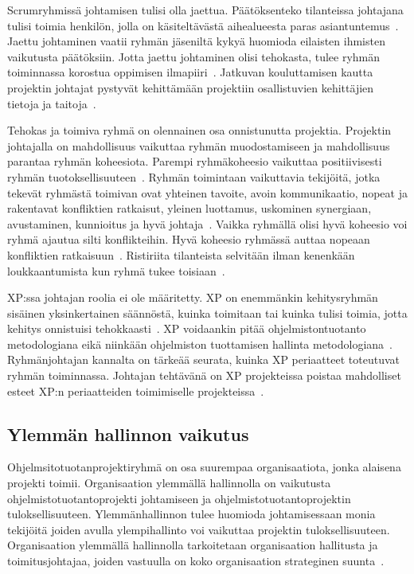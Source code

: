\documentclass[finnish]{tktltiki2}
\theoremstyle{definition}
\theoremstyle{remark}
\begin{document}
Scrumryhmissä johtamisen tulisi olla jaettua. Päätöksenteko tilanteissa johtajana tulisi toimia henkilön, jolla on käsiteltävästä aihealueesta paras asiantuntemus~\cite{4755768}. Jaettu johtaminen vaatii ryhmän jäseniltä kykyä huomioda eilaisten ihmisten vaikutusta päätöksiin. Jotta jaettu johtaminen olisi tehokasta, tulee ryhmän toiminnassa korostua oppimisen ilmapiiri~\cite{4755768}. Jatkuvan kouluttamisen kautta projektin johtajat pystyvät kehittämään projektiin osallistuvien kehittäjien tietoja ja taitoja~\cite{dall2004project}.

Tehokas ja toimiva ryhmä on olennainen osa onnistunutta projektia. Projektin johtajalla on mahdollisuus vaikuttaa ryhmän muodostamiseen ja mahdollisuus parantaa ryhmän koheesiota. Parempi ryhmäkoheesio vaikuttaa positiivisesti ryhmän tuotoksellisuuteen~\cite{bahli2005group, McLeod:2011:FAS:1978802.1978803}. Ryhmän toimintaan vaikuttavia tekijöitä, jotka tekevät ryhmästä toimivan ovat yhteinen tavoite, avoin kommunikaatio, nopeat ja rakentavat konfliktien ratkaisut, yleinen luottamus, uskominen synergiaan, avustaminen, kunnioitus ja hyvä johtaja~\cite{4017705}. Vaikka ryhmällä olisi hyvä koheesio voi ryhmä ajautua silti konflikteihin. Hyvä koheesio ryhmässä auttaa nopeaan konfliktien ratkaisuun~\cite{bradley1997effect}. Ristiriita tilanteista selvitään ilman kenenkään loukkaantumista kun ryhmä tukee toisiaan~\cite{bradley1997effect}.

XP:ssa johtajan roolia ei ole määritetty. XP on enemmänkin kehitysryhmän sisäinen yksinkertainen säännöstä, kuinka toimitaan tai kuinka tulisi toimia, jotta kehitys onnistuisi tehokkaasti~\cite{Augustine:2005:APM:1101779.1101781}. XP voidaankin pitää ohjelmistontuotanto metodologiana eikä niinkään ohjelmiston tuottamisen hallinta metodologiana~\cite{cohen2004introduction}. Ryhmänjohtajan kannalta on tärkeää seurata, kuinka XP periaatteet toteutuvat ryhmän toiminnassa. Johtajan tehtävänä on XP projekteissa poistaa mahdolliset esteet XP:n periaatteiden toimimiselle projekteissa~\cite{Augustine:2005:APM:1101779.1101781}.





\subsection{Ylemmän hallinnon vaikutus}

Ohjelmsitotuotanprojektiryhmä on osa suurempaa organisaatiota, jonka alaisena projekti toimii. Organisaation ylemmällä hallinnolla on vaikutusta ohjelmistotuotantoprojekti johtamiseen ja ohjelmistotuotantoprojektin tuloksellisuuteen. Ylemmänhallinnon tulee huomioda johtamisessaan monia tekijöitä joiden avulla ylempihallinto voi vaikuttaa projektin tuloksellisuuteen. Organisaation ylemmällä hallinnolla tarkoitetaan organisaation hallitusta ja toimitusjohtajaa, joiden vastuulla on koko organisaation strateginen suunta~\cite{McLeod:2011:FAS:1978802.1978803}.
\end{document}
